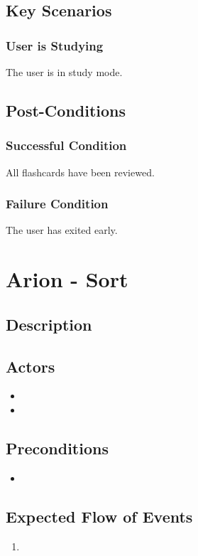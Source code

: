 \documentclass{scrreprt}
\begin{document}
\section{Key Scenarios}
    \subsection{User is Studying}
    The user is in study mode.

\section{Post-Conditions}
    \subsection{Successful Condition}
    All flashcards have been reviewed.
    
    \subsection{Failure Condition}
    The user has exited early.

\chapter{Arion - Sort}

\section{Description}

\section{Actors}
\begin{itemize}
    \item 
    \item 
\end{itemize}

\section{Preconditions}
\begin{itemize}
    \item 
\end{itemize}

\section{Expected Flow of Events}
\begin{enumerate}[1.]
    \item 
\end{enumerate}
\end{document}
